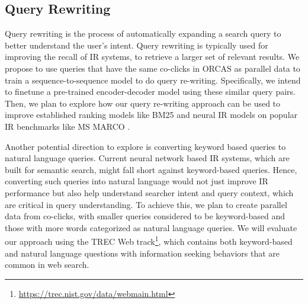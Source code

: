 \subsection{Query Rewriting}
Query rewriting is the process of automatically expanding a search query to better understand the user's intent. Query rewriting is typically used for improving the recall of IR systems, to retrieve a larger set of relevant results. We propose to use queries that have the same co-clicks in ORCAS as parallel data to train a sequence-to-sequence model to do query re-writing. Specifically, we intend to finetune a pre-trained encoder-decoder model \cite{lewis2020bart, raffel2020exploring} using these similar query pairs. Then, we plan to explore how our query re-writing approach can be used to improve established ranking models like BM25 \cite{robertson2009probabilistic} and neural IR models \cite{karpukhin2020dense, khattab2020colbert} on popular IR benchmarks like MS MARCO \cite{Campos2016MSMA}.

Another potential direction to explore is converting keyword based queries to natural language queries. Current neural network based IR systems, which are built for semantic search, might fall short against keyword-based queries. Hence, converting such queries into natural language would not just improve IR performance but also help understand searcher intent and query context, which are critical in query understanding. To achieve this, we plan to create parallel data from co-clicks, with smaller queries considered to be keyword-based and those with more words categorized as natural language queries. We will evaluate our approach using the TREC Web track\footnote{\href{https://trec.nist.gov/data/webmain.html}{https://trec.nist.gov/data/webmain.html}}, which contains both keyword-based and natural language questions with information seeking behaviors that are common in web search. 

